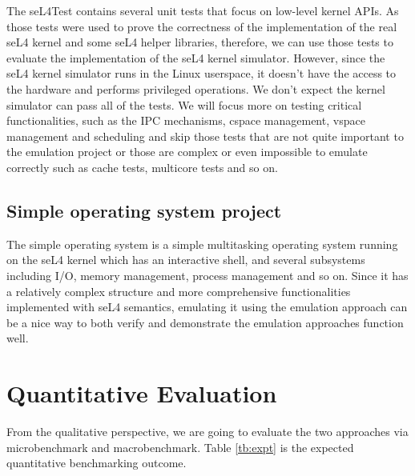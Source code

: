 The seL4Test contains several unit tests that focus on low-level kernel APIs. As those tests were used to prove the correctness of the implementation of the real seL4 kernel and some seL4 helper libraries, therefore, we can use those tests to evaluate the implementation of the seL4 kernel simulator. However, since the seL4 kernel simulator runs in the Linux userspace, it doesn't have the access to the hardware and performs privileged operations. We don't expect the kernel simulator can pass all of the tests. We will focus more on testing critical functionalities, such as the IPC mechanisms, cspace management, vspace management and scheduling and skip those tests that are not quite important to the emulation project or those are complex or even impossible to emulate correctly such as cache tests, multicore tests and so on.

\subsection{Simple operating system project}

The simple operating system is a simple multitasking operating system running on the seL4 kernel which has an interactive shell, and several subsystems including I/O, memory management, process management and so on. Since it has a relatively complex structure and more comprehensive functionalities implemented with seL4 semantics, emulating it using the emulation approach can be a nice way to both verify and demonstrate the emulation approaches function well.

\section{Quantitative Evaluation}

From the qualitative perspective, we are going to evaluate the two approaches via microbenchmark and macrobenchmark. Table \ref{tb:expt} is the expected quantitative benchmarking outcome.

